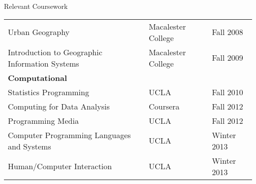 \documentclass{resume} %
\begin{document}
\begin{rSection}{Relevant Coursework}
\begin{tabular}[c]{ lll}
\hline
Urban Geography & Macalester College & Fall 2008  \\
Introduction to Geographic Information Systems & Macalester College & Fall 2009 \\
\multicolumn{3}{l}{\bf Computational} \rule{0pt}{4ex}\\
\hline
Statistics Programming & UCLA & Fall 2010  \\
Computing for Data Analysis & Coursera & Fall 2012 \\
Programming Media & UCLA & Fall 2012 \\
Computer Programming Languages and Systems & UCLA & Winter 2013 \\
Human/Computer Interaction & UCLA & Winter 2013 \\
\end{tabular}
\end{rSection}
\end{document}
